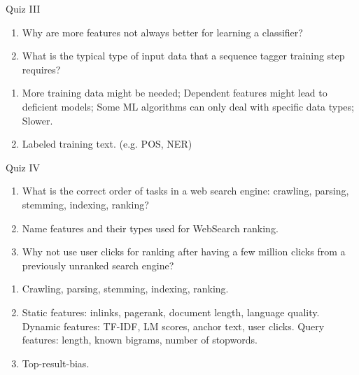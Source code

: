 \documentclass{article}
\begin{document}
\begin{exercise}{Quiz III}
  \begin{enumerate}
    \item Why are more features not always better for learning a classifier?
    \item What is the typical type of input data that a sequence tagger training step requires?
  \end{enumerate}

  \begin{solution}
    \begin{enumerate}
      \item More training data might be needed; Dependent features might lead to deficient models; Some ML algorithms can only deal with specific data types; Slower.
      \item Labeled training text. (e.g. POS, NER)
    \end{enumerate}
  \end{solution}
\end{exercise}

\begin{exercise}{Quiz IV}
  \begin{enumerate}
    \item What is the correct order of tasks in a web search engine: crawling, parsing, stemming, indexing, ranking?
    \item Name features and their types used for WebSearch ranking.
    \item Why not use user clicks for ranking after having a few million clicks from a previously unranked search engine?
  \end{enumerate}

  \begin{solution}
    \begin{enumerate}
      \item Crawling, parsing, stemming, indexing, ranking.
      \item Static features: inlinks, pagerank, document length, language quality. Dynamic features: TF-IDF, LM scores, anchor text, user clicks. Query features: length, known bigrams, number of stopwords.
      \item Top-result-bias.
    \end{enumerate}
  \end{solution}
\end{exercise}
\end{document}
